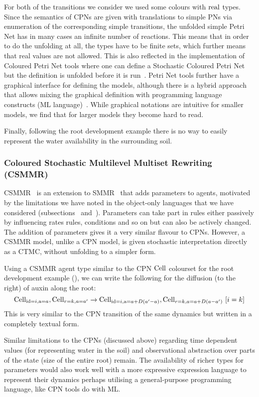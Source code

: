 For both of the transitions we consider we used some colours with $\mathrm{real}$
types. Since the semantics of CPNs are given with translations to simple PNs via
enumeration of the corresponding simple transitions, the unfolded simple Petri
Net has in many cases an infinite number of reactions. This means that in order
to do the unfolding at all, the types have to be finite sets, which further
means that real values are not allowed. This is also reflected in the
implementation of Coloured Petri Net tools where one can define a Stochastic
Coloured Petri Net but the definition is unfolded before it is
run~\citep{heiner_snoopyunifying_2012}. Petri Net tools further have a graphical
interface for defining the models, although there is a hybrid approach that
allows mixing the graphical definition with programming language constructs (ML
language)~\cite{jensen_coloured_1987}. While graphical notations are intuitive
for smaller models, we find that for larger models they become hard to read.

Finally, following the root development example there is no way to easily
represent the water availability in the surrounding soil.

\subsubsection*{Coloured Stochastic Multilevel Multiset Rewriting (CSMMR)}
CSMMR~\citep{oury_coloured_2011} is an extension to
SMMR~\citep{oury_multi-level_2013} that adds parameters to agents, motivated by
the limitations we have noted in the object-only languages that we have
considered (subsections~ and~). Parameters can take
part in rules either passively by influencing rates rules, conditions and so on
but can also be actively changed. The addition of parameters gives it a very
similar flavour to CPNs. However, a CSMMR model, unlike a CPN model, is given
stochastic interpretation directly as a CTMC, without unfolding to a simpler
form.

Using a CSMMR agent type similar to the CPN $\mathrm{Cell}$ colourset for the root
development example (), we can write the following
for the diffusion (to the right) of auxin along the root:
$$
\mathrm{Cell}_{\mathrm{id}=i, \mathrm{a}=a}, \mathrm{Cell}_{r=k, a=a'} \xrightarrow{}
\mathrm{Cell}_{\mathrm{id}=i, \mathrm{a}=a+D(a'-a)}, \mathrm{Cell}_{r=k, a=a+D(a-a')} \, \,
[i=k]
$$
This is very similar to the CPN transition of the same dynamics but written in a
completely textual form.

Similar limitations to the CPNs (discussed above) regarding time dependent
values (\eg for representing water in the soil) and observational abstraction
over parts of the state (\eg size of the entire root) remain. The availability
of richer types for parameters would also work well with a more expressive
expression language to represent their dynamics perhaps utilising a
general-purpose programming language, like CPN tools do with ML.

